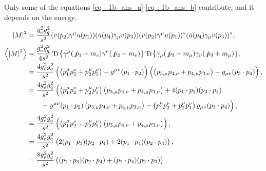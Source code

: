 \documentclass[
a4paper,
10pt,
twoside,
prd,
aps,
nofootinbib,
superscriptaddress,
floatfix,
preprintnumbers,
]{article}
\begin{document}
Only some of the equations \ref{eq : 1b_ans_u}-\ref{eq : 1b_ans_b} contribute, and it depends on the energy.
\begin{align}
    \abs{M}^2&= \frac{g_e^2g_q^2}{s^2} (\bar{v}(p_2)\gamma^\mu u(p_1))(\bar{u}(p_4)\gamma_\mu v(p_3)) (\bar{v}(p_2)\gamma^\mu u(p_1))^*(\bar{u}(p_4)\gamma_\mu v(p_3))^*,\\
    \ev{\abs{M}^2} &= \frac{g_e^2g_q^2}{4s^2} \Tr{\gamma^\mu (\not p_1+m_e)\gamma^\nu (\not p_2-m_e)} \Tr{\gamma_\mu(\not p_3 - m_\mu)\gamma_\nu(\not p_4 + m_\mu)},\\
    &= \frac{4g_e^2g_q^2}{s^2} \left(\left(p_1^\mu p_2^\nu + p_2^\mu p_1^\nu\right) -g^{\mu\nu} (p_1\cdot p_2) \right) \left(\left(p_{3,\mu} p_{4,\nu} + p_{4,\mu} p_{3,\nu}\right) -g_{\mu\nu} (p_3\cdot p_4)\right),\\
    &=  \frac{4g_e^2g_q^2}{s^2} \left(\left(p_1^\mu p_2^\nu + p_2^\mu p_1^\nu\right)\left(p_{3,\mu} p_{4,\nu} + p_{4,\mu} p_{3,\nu}\right) + 4 (p_1\cdot p_2)(p_3\cdot p_4)\right.\nonumber\\
    &\qquad - \left. g^{\mu\nu} (p_1\cdot p_2)\left(p_{3,\mu} p_{4,\nu} + p_{4,\mu} p_{3,\nu}\right) - \left(p_1^\mu p_2^\nu + p_2^\mu p_1^\nu\right)g_{\mu\nu} (p_3\cdot p_4) \right),\\
    &= \frac{4g_e^2g_q^2}{s^2} \left(\left(p_1^\mu p_2^\nu + p_2^\mu p_1^\nu\right)\left(p_{3,\mu} p_{4,\nu} + p_{4,\mu} p_{3,\nu}\right) \right),\\
    &= \frac{4g_e^2g_q^2}{s^2} \left(2(p_1\cdot p_3)(p_2\cdot p_4) + 2(p_1 \cdot p_4)(p_2 \cdot p_3) \right),\\
    &= \frac{8g_e^2g_q^2}{s^2} \left((p_1\cdot p_3)(p_2\cdot p_4) + (p_1 \cdot p_4)(p_2 \cdot p_3) \right)
\end{align}
\end{document}
